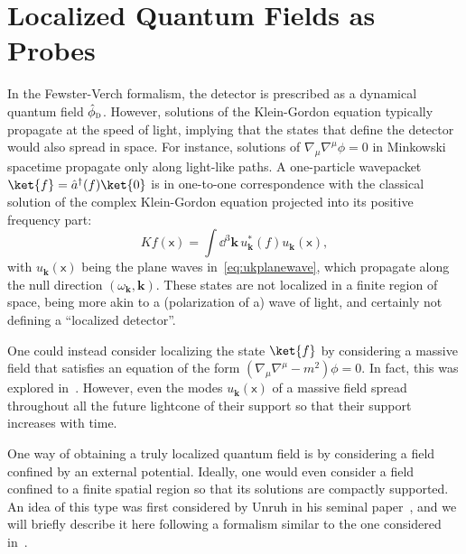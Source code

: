 \documentclass[letterpaper,12pt,titlepage,oneside,final]{book}
\newcommand{\mf}{\mathsf}%
\newcommand{\tc}[1]{\textsc{#1}}
\begin{document}




\section{Localized Quantum Fields as Probes}\label{sec:LocalizedQuantumFields}

In the Fewster-Verch formalism, the detector is prescribed as a dynamical quantum field $\hat{\phi}_\tc{d}$. However, solutions of the Klein-Gordon equation typically propagate at the speed of light, implying that the states that define the detector would also spread in space. For instance, solutions of $\nabla_\mu\nabla^\mu\phi = 0$ in Minkowski spacetime propagate only along light-like paths. A one-particle wavepacket $\ket{f} = \hat{a}^\dagger(f)\ket{0}$ is in one-to-one correspondence with the classical solution of the complex Klein-Gordon equation projected into its positive frequency part:
\begin{equation}
    Kf(\mf x) = \int \dd^3\bm k \,u^*_{\bm k}(f) u_{\bm k}(\mf x),
\end{equation}
with $u_{\bm k}(\mf x)$ being the plane waves in~\eqref{eq:ukplanewave}, which propagate along the null direction $(\omega_{\bm k}, \bm k)$. These states are not localized in a finite region of space, being more akin to a (polarization of a) wave of light, and certainly not defining a ``localized detector''.

One could instead consider localizing the state $\ket{f}$ by considering a massive field that satisfies an equation of the form $(\nabla_\mu \nabla^\mu - m^2)\phi = 0$. In fact, this was explored in~\cite{achimFlaminia}. However, even the modes $u_{\bm k}(\mf x)$ of a massive field spread throughout all the future lightcone of their support so that their support increases with time.

One way of obtaining a truly localized quantum field is by considering a field confined by an external potential. Ideally, one would even consider a field confined to a finite spatial region so that its solutions are compactly supported. An idea of this type was first considered by Unruh in his seminal paper~\cite{Unruh1976}, and we will briefly describe it here following a formalism similar to the one considered in~\cite{QFTPD}. 
\end{document}
